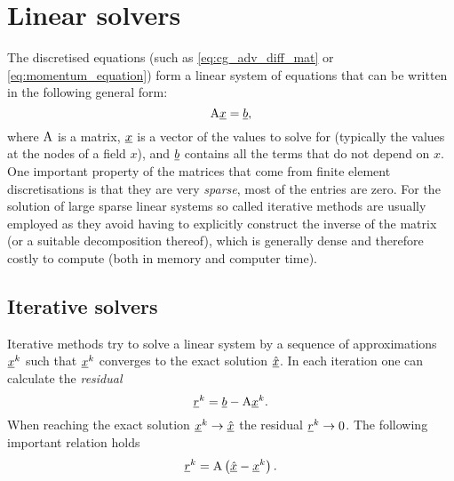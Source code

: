 \section{Linear solvers} \label{ND_Linear_solvers}
The discretised equations (such as \eqref{eq:cg_adv_diff_mat} or \eqref{eq:momentum_equation}) form
a linear system of equations that can be written
in the following general form:
\begin{equation*}
  \mathrm{A}\underline{x}=\underline{b},
\end{equation*}
where $\mathrm{A}$ is a matrix, $\underline{x}$ is a vector of the values
to solve for (typically the values at the nodes of a field $x$),
and $\underline{b}$ contains all the terms that do not depend on
$x$. One important property of the matrices that come from
finite element discretisations is that they are very \emph{sparse},
\ie most of the entries are zero. For the solution of large
sparse linear systems so called iterative methods are usually employed
as they
avoid having to explicitly construct the inverse of the matrix
(or a suitable decomposition thereof),
which is generally dense and therefore costly to compute
(both in memory and computer time).

\subsection{Iterative solvers}
Iterative methods try to solve a linear system by a sequence
of approximations $\underline{x}^k$ such that $\underline{x}^k$ converges to
the exact solution $\underline{\hat x}$. In each iteration one can
calculate the \emph{residual}
\begin{equation*}
  \underline{r}^k = \underline{b} - \mathrm{A}\underline{x}^k.
\end{equation*}
When reaching the exact solution $\underline{x}^k\to\underline{\hat x}$ the
residual $\underline{r}^k\to 0$. The following important relation holds
\begin{equation}\label{eq:residual_error}
  \underline{r}^k = \mathrm{A}\left( \underline{\hat x} - \underline{x}^k \right).
\end{equation}

